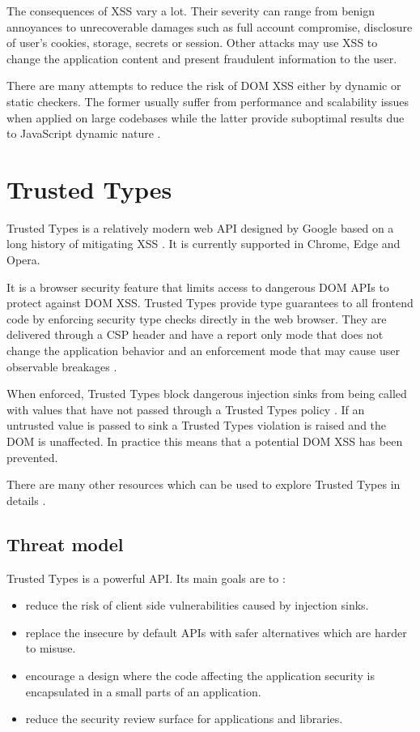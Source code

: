 The consequences of XSS vary a lot. Their severity can range from benign annoyances to unrecoverable
damages such as full account compromise, disclosure of user's cookies, storage, secrets or session.
Other attacks may use XSS to change the application content and present fraudulent information to
the user.

There are many attempts to reduce the risk of DOM XSS either by dynamic or static checkers. The
former usually suffer from performance and scalability issues when applied on large codebases while
the latter provide suboptimal results due to JavaScript dynamic nature
\cite{tt_web_framework_paper} \cite{owasp_xss_cheatsheet}.

\section{Trusted Types}

Trusted Types is a relatively modern web API designed by Google based on a long history of
mitigating XSS \cite{tt_design_history}. It is currently supported in Chrome, Edge and Opera.

It is a browser security feature that limits access to dangerous DOM APIs to protect against DOM
XSS. Trusted Types provide type guarantees to all frontend code by enforcing security type checks
directly in the web browser. They are delivered through a CSP header and have a report only mode
that does not change the application behavior and an enforcement mode that may cause user observable
breakages \cite{tt_background}.

When enforced, Trusted Types block dangerous injection sinks from being called with values that have
not passed through a Trusted Types policy \cite{tt_background}. If an untrusted value is passed to
sink a Trusted Types violation is raised and the DOM is unaffected. In practice this means that a
potential DOM XSS has been prevented.

There are many other resources which can be used to explore Trusted Types in details
\cite{tt_resources}.

\subsection{Threat model}

Trusted Types is a powerful API. Its main goals are to \cite{tt_spec:goals}:

\begin{itemize}
  \item reduce the risk of client side vulnerabilities caused by injection sinks.
  \item replace the insecure by default APIs with safer alternatives which are harder to misuse.
  \item encourage a design where the code affecting the application security is encapsulated in a
        small parts of an application.
  \item reduce the security review surface for applications and libraries.
\end{itemize}

